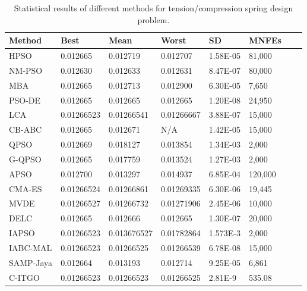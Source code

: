 
\begin{table*}[tp]
    \tiny
\begin{center}

\begin{tabular}{ P{2.0cm} P{2.0cm} P{2.0cm} P{2.0cm} P{2.0cm} P{2.0cm} P{2.0cm} P{2.0cm}  }
\hline
\textbf{Method} & \textbf{Best} & \textbf{Mean} & \textbf{Worst} & \textbf{SD} & \textbf{MNFEs} \\
\hline

HPSO & 0.012665 & 0.012719 & 0.012707 & 1.58E-05 & 81,000 \\
NM-PSO & 0.012630 & 0.012633 & 0.012631 & 8.47E-07 & 80,000 \\
MBA & 0.012665 & 0.012713 & 0.012900 & 6.30E-05 & 7,650 \\
PSO-DE & 0.012665 & 0.012665 & 0.012665 & 1.20E-08 & 24,950 \\
LCA & 0.01266523 & 0.01266541 & 0.01266667 & 3.88E-07 & 15,000 \\
CB-ABC & 0.012665 & 0.012671 & N/A & 1.42E-05 & 15,000 \\
QPSO & 0.012669 & 0.018127 & 0.013854 & 1.34E-03 & 2,000 \\
G-QPSO & 0.012665 & 0.017759 & 0.013524 & 1.27E-03 & 2,000 \\
APSO & 0.012700 & 0.013297 & 0.014937 & 6.85E-04 & 120,000 \\
CMA-ES & 0.01266524 & 0.01266861 & 0.01269335 & 6.30E-06 & 19,445 \\
MVDE & 0.01266527 & 0.01266732 & 0.01271906 & 2.45E-06 & 10,000 \\
DELC & 0.012665 & 0.012666 & 0.012665 & 1.30E-07 & 20,000 \\
IAPSO & 0.01266523 & 0.013676527 & 0.01782864 & 1.573E-3 & 2,000 \\
IABC-MAL & 0.01266523 & 0.01266525 & 0.01266539 & 6.78E-08 & 15,000 \\
SAMP-Jaya & 0.012664 & 0.013193 & 0.012714 & 9.25E-05 & 6,861 \\
C-ITGO & 0.01266523 & 0.01266523 & 0.01266525 & 2.81E-9 & 535.08 \\

\hline
\end{tabular}
\end{center}

\caption{ Statistical results of different methods for tension/compression spring design problem. \\[1em]}
\label{tab:TC}
\end{table*}

